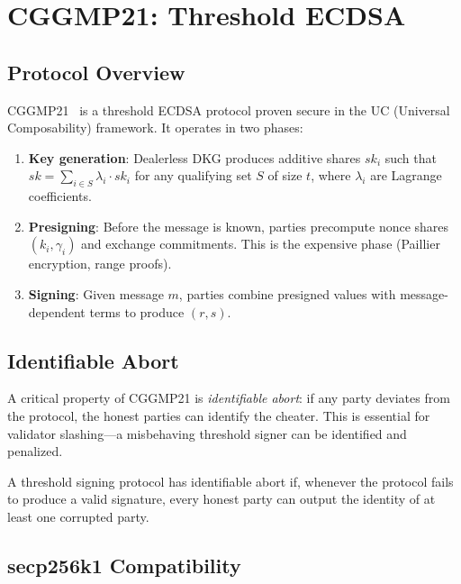 \section{CGGMP21: Threshold ECDSA}

\label{sec:cggmp21}

\subsection{Protocol Overview}

CGGMP21~\cite{canetti2021uc} is a threshold ECDSA protocol proven secure in the
UC (Universal Composability) framework. It operates in two phases:

\begin{enumerate}[leftmargin=2em]
  \item \textbf{Key generation}: Dealerless DKG produces additive shares
        $sk_i$ such that $sk = \sum_{i \in S} \lambda_i \cdot sk_i$ for any
        qualifying set $S$ of size $t$, where $\lambda_i$ are Lagrange
        coefficients.
  \item \textbf{Presigning}: Before the message is known, parties precompute
        nonce shares $(k_i, \gamma_i)$ and exchange commitments. This is the
        expensive phase (Paillier encryption, range proofs).
  \item \textbf{Signing}: Given message $m$, parties combine presigned values
        with message-dependent terms to produce $(r, s)$.
\end{enumerate}

\subsection{Identifiable Abort}

A critical property of CGGMP21 is \emph{identifiable abort}: if any party deviates
from the protocol, the honest parties can identify the cheater. This is essential for
validator slashing---a misbehaving threshold signer can be identified and penalized.

\begin{definition}
A threshold signing protocol has identifiable abort if, whenever the protocol fails
to produce a valid signature, every honest party can output the identity of at least
one corrupted party.
\end{definition}

\subsection{secp256k1 Compatibility}

